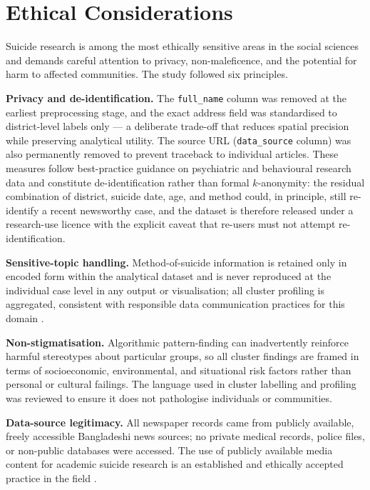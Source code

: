 \section{Ethical Considerations}

Suicide research is among the most ethically sensitive areas in the social sciences and demands careful attention to privacy, non-maleficence, and the potential for harm to affected communities. The study followed six principles.

\textbf{Privacy and de-identification.} The \texttt{full\_name} column was removed at the earliest preprocessing stage, and the exact address field was standardised to district-level labels only --- a deliberate trade-off that reduces spatial precision while preserving analytical utility. The source URL (\texttt{data\_source} column) was also permanently removed to prevent traceback to individual articles. These measures follow best-practice guidance on psychiatric and behavioural research data \cite{ref22} and constitute de-identification rather than formal $k$-anonymity: the residual combination of district, suicide date, age, and method could, in principle, still re-identify a recent newsworthy case, and the dataset is therefore released under a research-use licence with the explicit caveat that re-users must not attempt re-identification.

\textbf{Sensitive-topic handling.} Method-of-suicide information is retained only in encoded form within the analytical dataset and is never reproduced at the individual case level in any output or visualisation; all cluster profiling is aggregated, consistent with responsible data communication practices for this domain \cite{ref23}.

\textbf{Non-stigmatisation.} Algorithmic pattern-finding can inadvertently reinforce harmful stereotypes about particular groups, so all cluster findings are framed in terms of socioeconomic, environmental, and situational risk factors rather than personal or cultural failings. The language used in cluster labelling and profiling was reviewed to ensure it does not pathologise individuals or communities.

\textbf{Data-source legitimacy.} All newspaper records came from publicly available, freely accessible Bangladeshi news sources; no private medical records, police files, or non-public databases were accessed. The use of publicly available media content for academic suicide research is an established and ethically accepted practice in the field \cite{ref23}.

